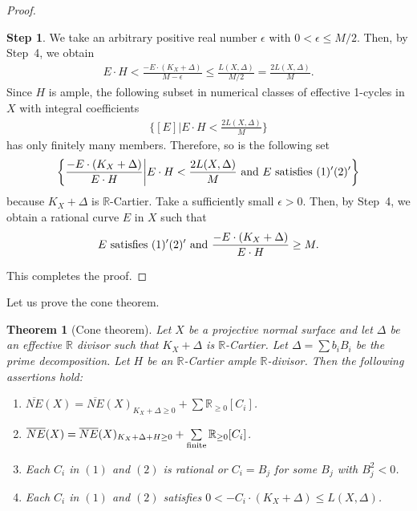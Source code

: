 \documentclass[12pt,twoside]{amsart}
\newtheorem{thm}{Theorem}[section]
\theoremstyle{definition}
\newtheorem{step}{Step}
\newcommand{\neb}{\overline{NE}}
\begin{document}
\begin{proof}
\begin{step}
We take an arbitrary positive real number $\epsilon$ 
with $0<\epsilon \leq M/2$. 
Then, by Step~4, we obtain 
\begin{eqnarray*}
E\cdot H<\frac{-E\cdot (K_X+\Delta)}{M-\epsilon} 
\leq \frac{L(X, \Delta)}{M/2}=\frac{2L(X, \Delta)}{M}
.\end{eqnarray*}
Since $H$ is ample, 
the following subset in numerical classes of 
effective 1-cycles in $X$ with integral coefficients
\begin{eqnarray*}
\{[E]|E\cdot H<\frac{2L(X, \Delta)}{M}\}
\end{eqnarray*}
has only finitely many members. 
Therefore, so is the following set 
\begin{eqnarray*}
\left\{\frac{-E\cdot (K_X+\Delta)}{E\cdot H}\middle|
E\cdot H<\frac{2L(X, \Delta)}{M}\,\,{\rm and}\,\,E\,\,{\rm satisfies }\,\,(1)'(2)'\right\}\end{eqnarray*}
because $K_X+\Delta$ is $\mathbb{R}$-Cartier. 
Take a sufficiently small $\epsilon>0$. 
Then, by Step~4, 
we obtain a rational curve $E$ in $X$ such that 
\begin{eqnarray*}
E\,\,{\rm satisfies}\,\,(1)'(2)'
\,\,{\rm and}\,\, 
\frac{-E\cdot (K_X+\Delta)}{E\cdot H}\geq M.\end{eqnarray*}
\end{step}
This completes the proof. 
\end{proof}


Let us prove the cone theorem. 

\begin{thm}[Cone theorem]\label{ct}
Let $X$ be a projective normal surface and 
let $\Delta$ be an effective $\mathbb{R}$ divisor 
such that $K_X+\Delta$ is $\mathbb{R}$-Cartier. 
Let $\Delta=\sum b_iB_i$ be the prime decomposition. 
Let $H$ be an $\mathbb{R}$-Cartier ample $\mathbb{R}$-divisor. 
Then the following assertions hold:

\begin{enumerate}

\item{
$
\neb(X)=
\neb(X)_{K_X+\Delta \geq 0}+
\sum{\mathbb{R}_{\geq 0}[C_i]}
$.}
\item{
$
\neb(X)=
\neb(X)_{K_X+\Delta+H \geq 0}+
\sum\limits_{\rm finite}{\mathbb{R}_{\geq 0}[C_i]}
$.}
\item{Each $C_i$ in $(1)$ and $(2)$ is rational or 
$C_i=B_j$ for some $B_j$ with $B_j^2<0$.}
\item{Each $C_i$ in $(1)$ and $(2)$ 
satisfies $0<-C_i\cdot (K_X+\Delta) \leq L(X, \Delta)$.}
\end{enumerate}
\end{thm}
\end{document}

